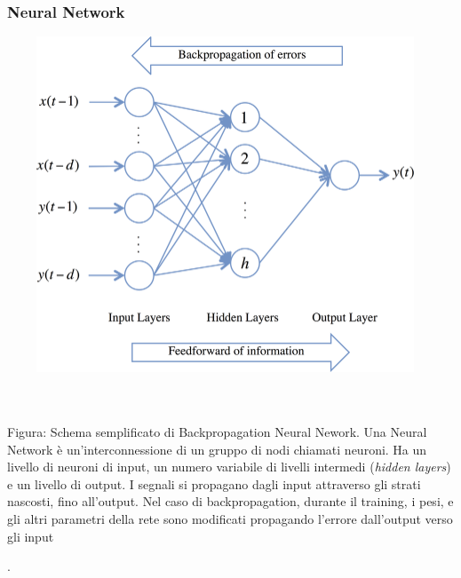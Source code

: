 \documentclass[a4paper,12pt]{report}
\begin{document}
\subsubsection{Neural Network}
\begin{fig}
	\begin{center}
			\includegraphics[width=13cm,height=10cm]{nn}
	\end{center}

	\caption{\\~\\Figura: Schema semplificato di Backpropagation Neural Nework. Una Neural Network è un'interconnessione di un gruppo di nodi chiamati neuroni. Ha un livello di neuroni di input, un numero variabile di livelli intermedi (\textit{hidden layers}) e un livello di output. I segnali si propagano dagli input attraverso gli strati nascosti, fino all'output. Nel caso di backpropagation, durante il training, i pesi, e gli altri parametri della rete sono modificati propagando l'errore dall'output verso gli input}.
\end{fig}
\end{document}
